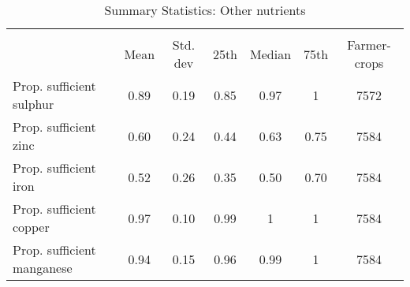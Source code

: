 \begin{table}[htbp]\centering
\def\sym#1{\ifmmode^{#1}\else\(^{#1}\)\fi}
\caption{Summary Statistics: Other nutrients\label{tab:sumstats}}
\begin{tabular}{l*{1}{cccccc}}
\toprule
                    &\multicolumn{6}{c}{}                                                         \\
                    &        Mean&    Std. dev&        25th&      Median&        75th&Farmer-crops\\
\midrule
Prop. sufficient sulphur&        0.89&        0.19&        0.85&        0.97&           1&        7572\\
Prop. sufficient zinc&        0.60&        0.24&        0.44&        0.63&        0.75&        7584\\
Prop. sufficient iron&        0.52&        0.26&        0.35&        0.50&        0.70&        7584\\
Prop. sufficient copper&        0.97&        0.10&        0.99&           1&           1&        7584\\
Prop. sufficient manganese&        0.94&        0.15&        0.96&        0.99&           1&        7584\\
\bottomrule
\end{tabular}
\end{table}
